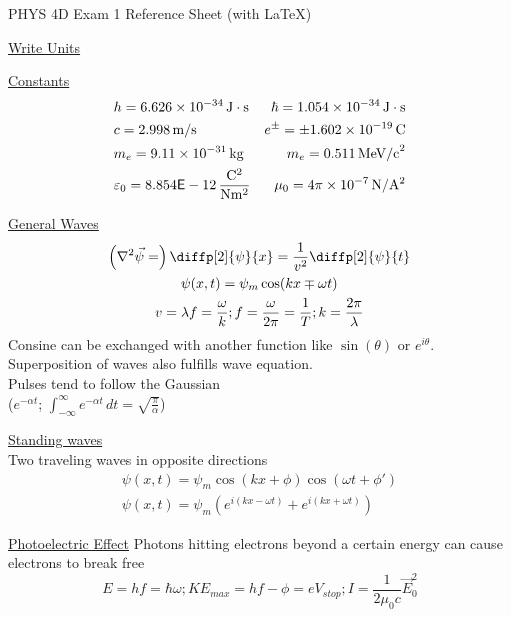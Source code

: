 \documentclass[8pt]{minimal}
\newcommand{\E}[1]{\times 10^{#1}}
\begin{document}
    \setlength{\parindent}{0pt}
    \setlength{\columnsep}{0.5cm}
    \twocolumn
    PHYS 4D Exam 1 Reference Sheet (with \LaTeX)

    \underline{Write Units}

    \underline{Constants}
        \begin{align*}
            &h = 6.626\E{-34}\,\unit{\joule\cdot\second}    &\hbar = 1.054\E{-34}\,\unit{\joule\cdot\second}\\
            &c = 2.998\,\unit{\meter/\second}   &e^{\pm} = \pm 1.602\E{-19}\,\unit{\coulomb}\\
            &m_e = 9.11\E{-31}\,\unit{\kilo\gram} &m_e = 0.511\,\text{MeV/c}^2\\
            &\varepsilon_0 = 8.854\mathsf{E}-12\,\unit{\frac{\coulomb^2}{\newton\meter^2}} &\mu_0 = 4\pi\E{-7}\,\unit{\newton/\ampere^2}
        \end{align*}
    
    \underline{General Waves}
    \begin{gather*}
        \left( \nabla^2 \vec{\psi} = \right) \diffp[2]{\psi}{x} = \frac{1}{v^2}\diffp[2]{\psi}{t}\\
        \psi(x,t) = \psi_m \cos(kx \mp \omega t)\\
        v = \lambda f = \frac{\omega}{k}; f = \frac{\omega}{2\pi} = \frac{1}{T}; k = \frac{2\pi}{\lambda}
    \end{gather*}
    Consine can be exchanged with another function like $\sin(\theta)$ or $e^{i\theta}$.\\
    Superposition of waves also fulfills wave equation.\\
    Pulses tend to follow the Gaussian \\
    ($e^{-\alpha t}$; $\int_{-\infty}^{\infty} e^{-\alpha t}\,dt = \sqrt{\frac{\pi}{\alpha}}$)

    \underline{Standing waves}\\
    Two traveling waves in opposite directions
    \begin{gather*}
        \psi(x,t)   =   \psi_m \cos(kx + \phi)\cos(\omega t + \phi')\\
        \psi(x,t)   =   \psi_m \left( e^{i(kx - \omega t)} + e^{i(kx + \omega t)} \right)
    \end{gather*}

    \underline{Photoelectric Effect}
        Photons hitting electrons beyond a certain energy can cause electrons to break free
        \begin{equation*}
            {\scriptstyle E = hf = \hbar\omega; KE_{max} = hf - \phi = eV_{stop}; I = \frac{1}{2\mu_0 c} \vec{E}_0^2}
        \end{equation*}
\end{document}
